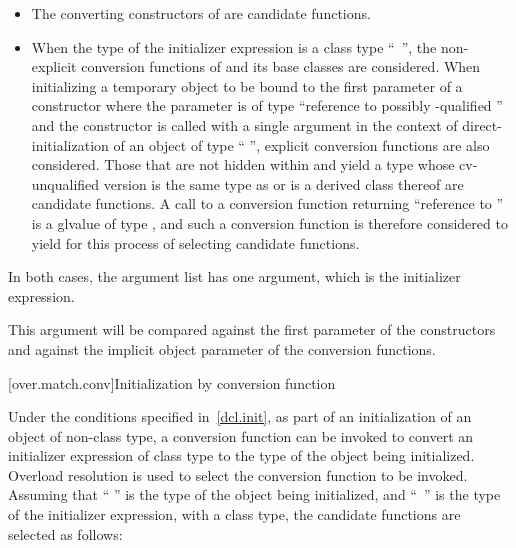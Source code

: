 \begin{itemize}
\item
The converting constructors of
are candidate functions.
\item
When the type of the initializer expression is a class type
``\cv{}~'',
the non-explicit conversion functions of
and its base classes are considered.
When initializing a temporary object
to be bound to the first parameter of a constructor
where the parameter is of type
``reference to possibly \cv-qualified ''
and the constructor is
called with a single argument in the context of
direct-initialization of an object of type `` '', explicit
conversion functions are also considered.
Those that are not hidden within
and yield a type whose cv-unqualified version is the same type as
or is a derived class thereof
are candidate functions.
A call to a conversion function returning ``reference to ''
is a glvalue of type , and such a conversion function is
therefore considered to yield  for this process of selecting
candidate functions.
\end{itemize}

\pnum
In both cases, the argument list has one argument, which is the initializer
expression.
\begin{note}
This argument will be compared against
the first parameter of the constructors and against the implicit
object parameter of the conversion functions.
\end{note}

[over.match.conv]{Initialization by conversion function}%

\pnum
Under the conditions specified in~\ref{dcl.init}, as
part of an initialization of an object of non-class type,
a conversion function can be invoked to convert an initializer
expression of class type to the type of the object
being initialized.
Overload resolution is used to select the
conversion function to be invoked.
Assuming that `` '' is the
type of the object being initialized, and ``\cv{}~'' is the type
of the initializer expression, with
a class type,
the candidate functions are selected as follows:

